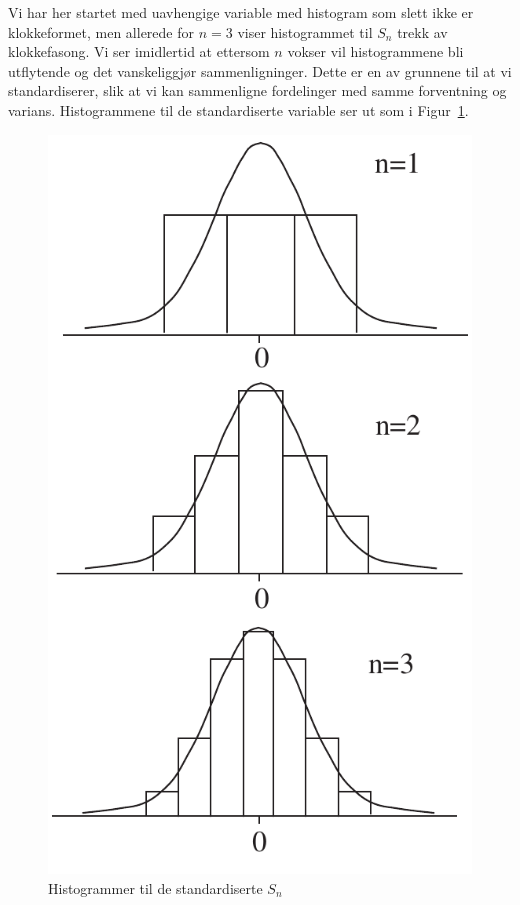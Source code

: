 \noindent Vi har her startet med uavhengige variable med histogram som
slett ikke er klokkeformet, men allerede for $n=3$ viser
histogrammet til $S_n$ trekk av klokkefasong. Vi ser imidlertid
at ettersom $n$ vokser vil histogrammene bli utflytende og det
vanskeliggjør sammenligninger. Dette er en av grunnene til at vi
standardiserer, slik at vi kan sammenligne fordelinger med samme
forventning og varians. Histogrammene til de standardiserte
variable ser ut som i Figur~\ref{fig:hist_standard}.
\clearpage
\begin{figure}[ht]
\centering
   \includegraphics[scale=0.8]{figurer/fig6_5.pdf} 
\caption{Histogrammer til de standardiserte $S_n$}
	\label{fig:hist_standard}
\end{figure}

